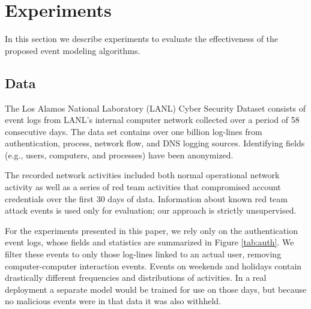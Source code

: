 \documentclass[letterpaper]{article} %
\begin{document}
\section{Experiments}
In this section we describe experiments to evaluate the effectiveness of the proposed event modeling algorithms.  
\subsection{Data} 
 
The Los Alamos National Laboratory (LANL) Cyber Security Dataset \cite{kent2016cyber} consists of event logs from LANL's  internal computer network collected over a period of 58 consecutive days. The data set contains over one billion log-lines from  authentication, process, network flow, and DNS logging sources. Identifying fields (e.g., users, computers, and processes) have been anonymized.
 
The recorded network activities included both normal operational network activity as well as a series of red team activities that compromised account credentials over the first 30 days of data.
Information about known red team attack events is used only for evaluation; our approach is strictly unsupervised.

For the experiments presented in this paper, we rely only on the authentication event logs, whose fields and statistics are summarized in Figure \ref{tab:auth}.  We  filter these events to only those log-lines linked to an actual user, removing computer-computer interaction events. Events on weekends and holidays contain drastically different frequencies and distributions of activities.  In a real deployment a separate model would be trained for use on those days, but because no malicious events were in that data it was also withheld.  
\end{document}
